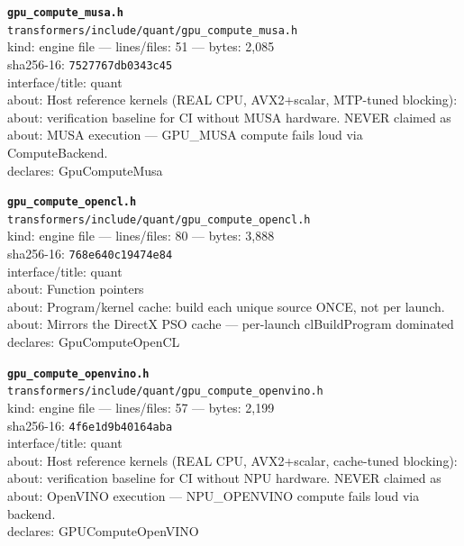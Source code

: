 \noindent\textbf{\texttt{gpu\_compute\_musa.h}}\\
\texttt{transformers/include/quant/gpu\_compute\_musa.h}\\
kind: engine file --- lines/files: 51 --- bytes: 2,085\\
sha256-16: \texttt{7527767db0343c45}\\
interface/title: quant\\
about: Host reference kernels (REAL CPU, AVX2+scalar, MTP-tuned blocking):\\
about: verification baseline for CI without MUSA hardware. NEVER claimed as\\
about: MUSA execution — GPU\_MUSA compute fails loud via ComputeBackend.\\
declares: GpuComputeMusa\\
\vspace*{6.0pt}

\noindent\textbf{\texttt{gpu\_compute\_opencl.h}}\\
\texttt{transformers/include/quant/gpu\_compute\_opencl.h}\\
kind: engine file --- lines/files: 80 --- bytes: 3,888\\
sha256-16: \texttt{768e640c19474e84}\\
interface/title: quant\\
about: Function pointers\\
about: Program/kernel cache: build each unique source ONCE, not per launch.\\
about: Mirrors the DirectX PSO cache — per-launch clBuildProgram dominated\\
declares: GpuComputeOpenCL\\
\vspace*{6.0pt}

\noindent\textbf{\texttt{gpu\_compute\_openvino.h}}\\
\texttt{transformers/include/quant/gpu\_compute\_openvino.h}\\
kind: engine file --- lines/files: 57 --- bytes: 2,199\\
sha256-16: \texttt{4f6e1d9b40164aba}\\
interface/title: quant\\
about: Host reference kernels (REAL CPU, AVX2+scalar, cache-tuned blocking):\\
about: verification baseline for CI without NPU hardware. NEVER claimed as\\
about: OpenVINO execution — NPU\_OPENVINO compute fails loud via backend.\\
declares: GPUComputeOpenVINO\\
\vspace*{6.0pt}
\newpage

